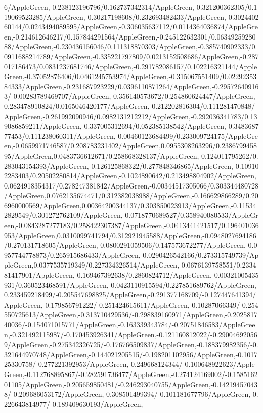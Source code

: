 {\begin{tikzternal}
{6/AppleGreen,-0.238123196796/0.162737342314/AppleGreen,-0.321200362305/0.119069523285/AppleGreen,-0.30217198608/0.232693482433/AppleGreen,-0.302440260144/0.0243494089595/AppleGreen,-0.306035637112/0.0114364036874/AppleGreen,-0.214612646217/0.157844291564/AppleGreen,-0.245122632301/0.0634925928088/AppleGreen,-0.230436156046/0.111318870303/AppleGreen,-0.385740902333/0.0911688214789/AppleGreen,-0.335221797809/0.0213152508686/AppleGreen,-0.287017186473/0.0831237681746/AppleGreen,-0.291782086157/0.102216321144/AppleGreen,-0.37052876406/0.0461245753974/AppleGreen,-0.315067551409/0.0229235384333/AppleGreen,-0.231687923229/0.0396110871264/AppleGreen,-0.295726409163/-0.00283789469707/AppleGreen,-0.356140573672/0.254860624447/AppleGreen,-0.283478910824/0.0165046420177/AppleGreen,-0.212202816304/0.111281470848/AppleGreen,-0.261992090946/0.0982131212212/AppleGreen,-0.292036341783/0.139086859211/AppleGreen,-0.337005312694/0.052385138542/AppleGreen,-0.348368777453/0.111238060311/AppleGreen,-0.00460123684499/0.233009724175/AppleGreen,-0.0659971746587/0.208783231402/AppleGreen,0.0955308263296/0.238679945895/AppleGreen,0.0483736612671/0.258668328137/AppleGreen,-0.124011795262/0.283043154393/AppleGreen,-0.126125868322/0.277848346865/AppleGreen,-0.109102283403/0.20502280814/AppleGreen,-0.1024890642/0.213498804902/AppleGreen,0.0624918354317/0.278247381842/AppleGreen,-0.00344517305066/0.303344480728/AppleGreen,0.0762135674471/0.312382038988/AppleGreen,-0.166629866289/0.206960000569/AppleGreen,0.00364200344137/0.303850023913/AppleGreen,-0.115342829549/0.301272762109/AppleGreen,-0.0718770689527/0.358940080533/AppleGreen,-0.0843287277183/0.258422307387/AppleGreen,-0.0413441421517/0.196401036953/AppleGreen,0.0310099741794/0.312921945588/AppleGreen,-0.0948027694186/0.270131718605/AppleGreen,-0.0800291059506/0.147573672277/AppleGreen,-0.0957744778873/0.265915686433/AppleGreen,-0.0290426542166/0.273315749739/AppleGreen,0.0377535719349/0.227334326514/AppleGreen,-0.0676139758551/0.233481417901/AppleGreen,-0.169467392638/0.2860824712/AppleGreen,-0.00321005435931/0.360523468591/AppleGreen,-0.0423110915594/0.227851689762/AppleGreen,-0.233459218499/-0.205547698825/AppleGreen,-0.291377168709/-0.127447641394/AppleGreen,-0.179856791222/-0.251424615611/AppleGreen,-0.10287066349/-0.254550725613/AppleGreen,-0.313710429536/-0.298839160971/AppleGreen,-0.202581740036/-0.154071015771/AppleGreen,-0.163339343784/-0.20751846583/AppleGreen,-0.321492115987/-0.170453926341/AppleGreen,-0.121160812022/-0.290046920569/AppleGreen,-0.275342326725/-0.176766509837/AppleGreen,-0.188379982356/-0.321644970748/AppleGreen,-0.144021205515/-0.198201102956/AppleGreen,-0.101725330758/-0.277221392953/AppleGreen,-0.249668124344/-0.100648922623/AppleGreen,-0.112768895867/-0.282591736477/AppleGreen,-0.274124169002/-0.158516201105/AppleGreen,-0.205659850481/-0.246293040755/AppleGreen,-0.142194570438/-0.209686053172/AppleGreen,-0.308501499394/-0.101181677796/AppleGreen,-0.226643814977/-0.189409630193/AppleGreen,
}
\end{tikzternal}}
